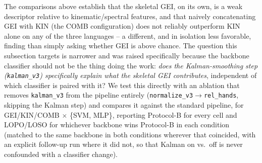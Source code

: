 \documentclass[journal]{IEEEtran}
\begin{document}
The comparisons above establish that the skeletal GEI, on its own, is a weak descriptor relative to kinematic/spectral features, and that naively concatenating GEI with KIN (the COMB configuration) does not reliably outperform KIN alone on any of the three languages -- a different, and in isolation less favorable, finding than simply asking whether GEI is above chance. The question this subsection targets is narrower and was raised specifically because the backbone classifier should not be the thing doing the work: \emph{does the Kalman-smoothing step (\texttt{kalman\_v3}) specifically explain what the skeletal GEI contributes}, independent of which classifier is paired with it? We test this directly with an ablation that removes \texttt{kalman\_v3} from the pipeline entirely (\texttt{normalize\_v3}$\to$\texttt{rel\_hands}, skipping the Kalman step) and compares it against the standard pipeline, for GEI/KIN/COMB $\times$ \{SVM, MLP\}, reporting Protocol-B for every cell and LOPO/LOSO for whichever backbone wins Protocol-B in each condition (matched to the same backbone in both conditions wherever that coincided, with an explicit follow-up run where it did not, so that Kalman on vs.\ off is never confounded with a classifier change).
\end{document}
